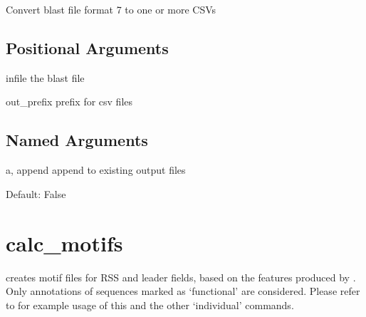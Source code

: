 \documentclass[letterpaper,10pt,english]{sphinxmanual}
\begin{document}
\sphinxAtStartPar

\sphinxAtStartPar
Convert blast file format 7 to one or more CSVs


\begin{sphinxVerbatim}[commandchars=\\\{\}]
  \PYG{p}{[}\PYG{p}{]} \PYG{p}{[}\PYG{p}{]}  
\end{sphinxVerbatim}


\subsection{Positional Arguments}
\label{\detokenize{tools/blastresults_to_csv:positional-arguments}}\begin{optionlist}{3cm}
\item [infile]  
\sphinxAtStartPar
the blast file
\item [out\_prefix]  
\sphinxAtStartPar
prefix for csv files
\end{optionlist}


\subsection{Named Arguments}
\label{\detokenize{tools/blastresults_to_csv:named-arguments}}\begin{optionlist}{3cm}
\item [\sphinxhyphen{}a, \sphinxhyphen{}\sphinxhyphen{}append]  
\sphinxAtStartPar
append to existing output files

\sphinxAtStartPar
Default: False
\end{optionlist}

\sphinxstepscope


\section{calc\_motifs}
\label{\detokenize{tools/calc_motifs:calc-motifs}}\label{\detokenize{tools/calc_motifs:id1}}\label{\detokenize{tools/calc_motifs::doc}}
\sphinxAtStartPar
{} creates motif files for RSS and leader fields, based on the features produced by {\hyperref[\detokenize{tools/parse_imgt_annotations:parse-imgt-annotations}]{}}. Only annotations
of sequences marked as ‘functional’ are considered. Please refer to  for example usage of this and the other ‘individual’ commands.
\end{document}
